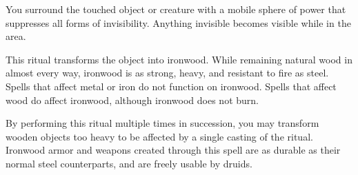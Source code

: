 \begin{spelleffect}
  You surround the touched object or creature with a mobile sphere of power that suppresses all forms of invisibility. Anything invisible becomes visible while in the area.
\end{spelleffect}

\begin{spelleffect}
This ritual transforms the object into ironwood. While remaining natural wood in almost every way, ironwood is as strong, heavy, and resistant to fire as steel. Spells that affect metal or iron do not function on ironwood. Spells that affect wood do affect ironwood, although ironwood does not burn.
\end{spelleffect}
\begin{spellnotes}
By performing this ritual multiple times in succession, you may transform wooden objects too heavy to be affected by a single casting of the ritual. Ironwood armor and weapons created through this spell are as durable as their normal steel counterparts, and are freely usable by druids.
\end{spellnotes}

